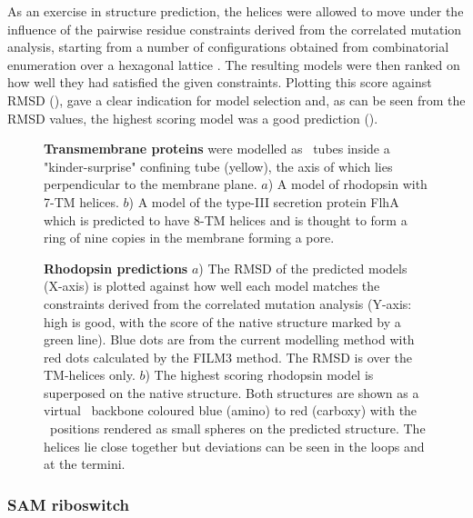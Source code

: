 As an exercise in structure prediction, the helices were allowed to move
under the influence of the pairwise residue constraints derived from the
correlated mutation analysis, starting from a number of configurations
obtained from combinatorial enumeration over a hexagonal lattice \cite{TaylorWRet94a}.
The resulting models were then ranked on how well they had satisfied the
given constraints.  Plotting this score against RMSD (),
gave a clear indication for model selection and, as can be seen from the
RMSD values, the highest scoring model was a good prediction ().

\begin{figure}
\centering
{}
\caption{
\label{Fig:TMmodels}
{\bf Transmembrane proteins} were modelled as \AH\ tubes inside a "kinder-surprise"
confining tube (yellow), the axis of which lies perpendicular to the membrane plane.
$a$) A model of rhodopsin with 7-TM helices.
$b$) A model of the type-III secretion protein FlhA which is predicted to have 8-TM helices
and is thought to form a ring of nine copies in the membrane forming a pore.
}
\end{figure}

\begin{figure}
\centering
{}
\caption{
\label{Fig:rhod-pred}
{\bf Rhodopsin predictions}
$a$) The RMSD of the predicted models (X-axis) is plotted against how well each model matches
the constraints derived from the correlated mutation analysis (Y-axis: high is good, with
the score of the native structure marked by a green line).
Blue dots are from the current modelling method with red dots calculated by the FILM3
method.  The RMSD is over the TM-helices only.
$b$) The highest scoring rhodopsin model is superposed on the native structure.
Both structures are shown as a virtual \CA\ backbone coloured blue (amino) to red (carboxy)
with the \CA\ positions rendered as small spheres on the predicted structure.
The helices lie close together but deviations can be seen in the loops and at the termini.
}
\end{figure}


\subsubsection{SAM riboswitch}

